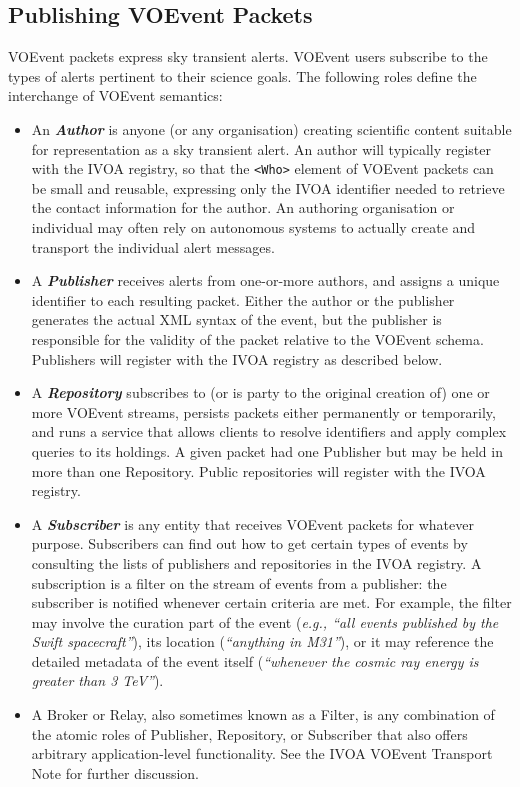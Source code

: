 \documentclass[11pt,a4paper]{ivoa}
\begin{document}
\subsection{Publishing VOEvent Packets}
\label{sec:2.1}
VOEvent packets express sky transient alerts. VOEvent users subscribe to the 
types of alerts pertinent to their science goals. The following roles define the
interchange of VOEvent semantics: 
\begin{itemize}
\item An \emph{\bf Author} is anyone (or any organisation) creating scientific 
content suitable for representation as a sky transient alert. An author will 
typically register with the IVOA registry, so that the {\tt <Who>} element of 
VOEvent packets can be small and reusable, expressing only the IVOA identifier 
needed to retrieve the contact information for the author. An authoring 
organisation or individual may often rely on autonomous systems to actually 
create and transport the individual alert messages. 
\item A \emph{\bf Publisher} receives alerts from one-or-more authors, and 
assigns a unique identifier to each resulting packet. Either the author or the 
publisher generates the actual XML syntax of the event, but the publisher is 
responsible for the validity of the packet relative to the VOEvent schema. 
Publishers will register with the IVOA registry as described below. 
\item A \emph{\bf Repository} subscribes to (or is party to the original 
creation of) one or more VOEvent streams, persists packets either permanently 
or temporarily, and runs a service that allows clients to resolve identifiers 
and apply complex queries to its holdings. A given packet had one Publisher but 
may be held in more than one Repository. Public repositories will register with 
the IVOA registry. 
\item A \emph{\bf Subscriber} is any entity that receives VOEvent packets for 
whatever purpose. Subscribers can find out how to get certain types of events 
by consulting the lists of publishers and repositories in the IVOA registry. 
A subscription is a filter on the stream of events from a publisher: the 
subscriber is notified whenever certain criteria are met. For example, the 
filter may involve the curation part of the event (\emph{e.g., ``all events 
published by the Swift spacecraft''}), its location (\emph{``anything in 
M31''}), or it may reference the detailed metadata of the event itself 
(\emph{``whenever the cosmic ray energy is greater than 3 TeV''}). 
\item A Broker or Relay, also sometimes known as a Filter, is any combination 
of the atomic roles of Publisher, Repository, or Subscriber that also offers 
arbitrary application-level functionality. See the IVOA VOEvent Transport Note 
\citep{2011ivoa.spec.0711S} for further discussion. 
\end{itemize}
\end{document}
